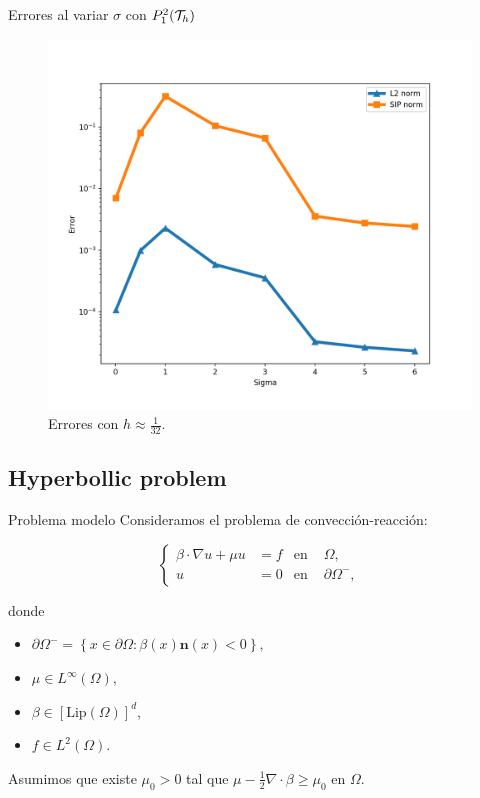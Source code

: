 		\begin{frame}{Errores al variar $\sigma$ con $\relax{P}_1^2(\mathcal{T}_h)$}
			\begin{figure}[h!]
				\centering
				\includegraphics[scale=0.37]{img/Difusion/errores_difusion_sigma.png}
				\caption{Errores con $h\approx\frac{1}{32}$.}
			\end{figure}
		\end{frame}

	\subsection{Hyperbollic problem}
	
	\begin{frame}{Problema modelo}
		Consideramos el problema de convección-reacción:
		\begin{block}{}
		\begin{equation*}
		\label{prob_modelo_hiperbolica}
		\left\{
		\begin{aligned}
		\beta\cdot\nabla u+\mu u&=f & \text{en } &\Omega, \\
		u&=0 & \text{en } &\partial\Omega^-,
		\end{aligned}
		\right.
		\end{equation*}
		\end{block}
		donde 
		\begin{itemize}
			\item $\partial\Omega^-=\left\{x\in\partial\Omega\colon \beta(x)\mathbf{n}(x)<0\right\},$
			\item $\mu\in L^\infty(\Omega)$,
			\item $\beta\in\left[\text{Lip}(\Omega)\right]^d$,
			\item $f\in L^2(\Omega)$.
		\end{itemize}
		\vspace*{.5cm}
		Asumimos que existe $\mu_0>0$ tal que $\displaystyle\mu-\frac{1}{2}\nabla\cdot\beta\geq\mu_0$ en $\Omega$.
		
	\end{frame}


